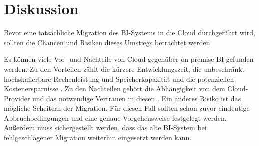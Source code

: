 \chapter{Diskussion} \label{ch:diskussion}
Bevor eine tatsächliche Migration des BI-Systems in die Cloud durchgeführt wird, sollten die Chancen und Risiken dieses Umstiegs betrachtet werden.

Es können viele Vor- und Nachteile von Cloud gegenüber on-premise BI gefunden werden. Zu den Vorteilen zählt die kürzere Entwicklungszeit, die unbeschränkt hochskalierbare Rechenleistung und Speicherkapazität und die potenziellen Kostenersparnisse \cite{ouf_cloud_2011}. Zu den Nachteilen gehört die Abhängigkeit von dem Cloud-Provider und das notwendige Vertrauen in diesen \cite{menon_business_2012}. Ein anderes Risiko ist das mögliche Scheitern der Migration. Für diesen Fall sollten schon zuvor eindeutige Abbruchbedingungen und eine genaue Vorgehensweise festgelegt werden. Außerdem muss sichergestellt werden, dass das alte BI-System bei fehlgeschlagener Migration weiterhin eingesetzt werden kann.